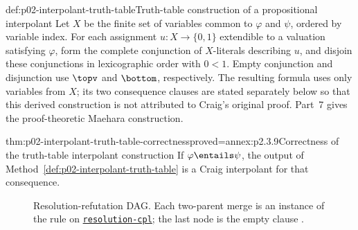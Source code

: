 \begin{hbmethod}{def:p02-interpolant-truth-table}{Truth-table construction of a propositional interpolant}
Let \(X\) be the finite set of variables common to \(\varphi\) and \(\psi\),
ordered by variable index.
For each assignment \(u:X\to\{0,1\}\) extendible to a valuation satisfying
\(\varphi\), form the complete conjunction of \(X\)-literals describing
\(u\), and disjoin these conjunctions in lexicographic order with \(0<1\).  Empty
conjunction and disjunction use \(\topv\) and \(\bottom\), respectively.
The resulting formula uses only variables from \(X\); its two consequence
clauses are stated separately below so that this derived construction is not
attributed to Craig's original proof.
Part~7 gives the proof-theoretic Maehara construction.
\end{hbmethod}

\begin{hblemma}{thm:p02-interpolant-truth-table-correctness}{proved=annex:p2.3.9}{Correctness of the truth-table interpolant construction}
If \(\varphi\entails\psi\), the output of
Method~\ref{def:p02-interpolant-truth-table} is a Craig interpolant for that
consequence.
\end{hblemma}

\begin{figure}[tp]
\centering
{}
\caption{Resolution-refutation DAG.  Each two-parent merge is an instance of
the rule on \hyperref[sheet:resolution-cpl]{\texttt{resolution-cpl}}; the last node is the empty clause
.}
\label{fig:p02-resolution-dag}
\end{figure}


